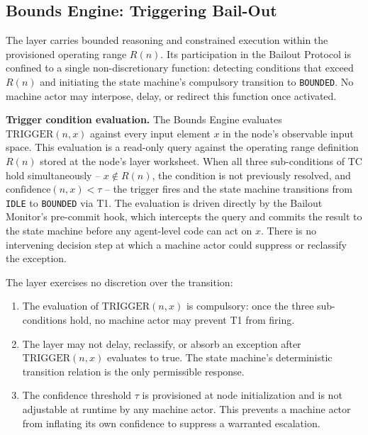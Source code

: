 \subsection{Bounds Engine: Triggering Bail-Out}\label{sec:bounds-trigger}

The \bounds{} layer carries bounded reasoning and constrained execution within the
provisioned operating range $R(n)$. Its participation in the Bailout Protocol is
confined to a single non-discretionary function: detecting conditions that exceed
$R(n)$ and initiating the state machine's compulsory transition to \texttt{BOUNDED}.
No machine actor may interpose, delay, or redirect this function once activated.

\medskip\noindent\textbf{Trigger condition evaluation.} The Bounds Engine evaluates
$\text{TRIGGER}(n, x)$ against every input element $x$ in the node's observable input
space. This evaluation is a read-only query against the operating range definition
$R(n)$ stored at the node's \bounds{} layer worksheet. When all three sub-conditions
of TC hold simultaneously -- $x \notin R(n)$, the condition is not previously resolved,
and $\text{confidence}(n, x) < \tau$ -- the trigger fires and the state machine
transitions from \texttt{IDLE} to \texttt{BOUNDED} via T1. The evaluation is driven
directly by the Bailout Monitor's pre-commit hook, which intercepts the query and
commits the result to the state machine before any agent-level code can act on $x$.
There is no intervening decision step at which a machine actor could suppress or
reclassify the exception.

The \bounds{} layer exercises no discretion over the transition:
\begin{enumerate}\itemsep=0pt
\item The evaluation of $\text{TRIGGER}(n, x)$ is compulsory: once the three
sub-conditions hold, no machine actor may prevent T1 from firing.
\item The \bounds{} layer may not delay, reclassify, or absorb an exception
after $\text{TRIGGER}(n, x)$ evaluates to true. The state machine's deterministic
transition relation is the only permissible response.
\item The confidence threshold $\tau$ is provisioned at node initialization and
is not adjustable at runtime by any machine actor. This prevents a machine actor
from inflating its own confidence to suppress a warranted escalation.
\end{enumerate}

